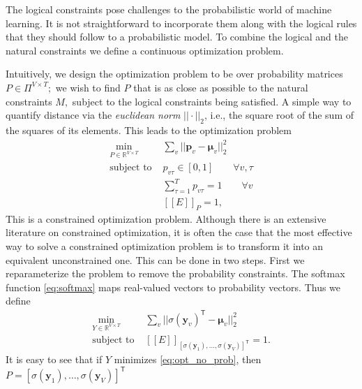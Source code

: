 \documentclass[sigplan,10pt,anonymous]{acmart} %
\newcommand{\qqpi}[2]{[\![#2]\!]_{#1}}
\theoremstyle{plain}
\theoremstyle{remark}
\theoremstyle{definition}
\begin{document}
The logical constraints pose challenges to the probabilistic world of
machine learning. It is not straightforward to incorporate them along with
the logical rules that they should follow to a probabilistic model. To combine the logical and the natural constraints we define a continuous
optimization problem.

\noindent {}

Intuitively, we design the optimization problem to be over
probability matrices $P \in \Pi^{V \times T};$ we wish to find
$P$ that is as close as possible to the natural constraints $M,$
subject to the logical constraints being satisfied. A simple
way to quantify
distance via the \emph{euclidean norm} $|| \cdot ||_2$, i.e., the square root of the sum of the squares of its elements.
 This leads to the optimization problem
\begin{equation}
  \begin{aligned}\label{eq:opt_naive}
    \underset{P \in \mathbb{R}^{V \times T}}{\mathrm{min}} &
    \sum_v || \bm{p}_v - \bm{\mu}_v ||_2^2                                                                  \\
    \text{subject to }                                     & p_{v\tau} \in [0, 1] \qquad \forall v, \tau    \\
                                                           & \sum_{\tau=1}^T p_{v\tau} = 1 \qquad \forall v \\
                                                           & \qqpi{P}{E} = 1,
  \end{aligned}
\end{equation}
This is a constrained optimization problem. Although there is an extensive
literature on constrained optimization, it is often the case
that the most effective way to solve a constrained optimization
problem is to transform it into an equivalent unconstrained one.
This can be done in two steps. First we reparameterize the problem
to remove the probability constraints. The softmax function \eqref{eq:softmax} maps real-valued vectors to probability vectors.
Thus we define
\begin{equation}
  \begin{aligned}\label{eq:opt_no_prob}
    \underset{Y \in \mathbb{R}^{V \times T}}{\mathrm{min}} &
    \sum_v || \sigma(\bm{y}_v)^\mathsf{T} - \bm{\mu}_v ||_2^2                                                                         \\
    \text{subject to }                                     & \qqpi{[\sigma(\bm{y}_1), \ldots, \sigma(\bm{y}_{V})]^\mathsf{T}}{E} = 1.
  \end{aligned}
\end{equation}
It is easy to see that if $Y$ minimizes \eqref{eq:opt_no_prob},
then
$P = [\sigma(\bm{y}_1), \ldots, \allowbreak \sigma(\bm{y}_{V})]^\mathsf{T}$
\end{document}
